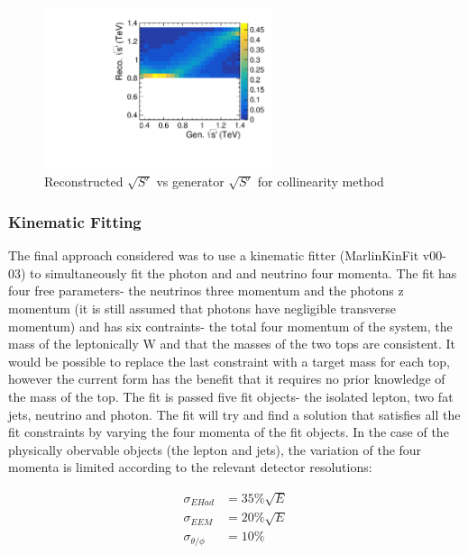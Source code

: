 \begin{figure}
  \centering
  \includegraphics[width=0.6\textwidth]{TopAnalysis/figures/ColEVsTrueE.pdf}
  \caption[Reconstructed $\sqrt{S'}$ vs generator $\sqrt{S'}$ for collinearity method]{Reconstructed $\sqrt{S'}$ vs generator $\sqrt{S'}$ for collinearity method}
  \label{fig:CollinearitySPrime}
\end{figure}

\subsubsection{Kinematic Fitting}

The final approach considered was to use a kinematic fitter (MarlinKinFit v00-03\cite{List:88030}) to simultaneously fit the photon and and neutrino four momenta. The fit has four free parameters- the neutrinos three momentum and the photons z momentum (it is still assumed that photons have negligible transverse momentum) and has six contraints- the total four momentum of the system, the mass of the leptonically W and that the masses of the two tops are consistent. It would be possible to replace the last constraint with a target mass for each top, however the current form has the benefit that it requires no prior knowledge of the mass of the top. The fit is passed five fit objects- the isolated lepton, two fat jets, neutrino and photon.  The fit will try and find a solution that satisfies all the fit constraints by varying the four momenta of the fit objects. In the case of the physically obervable objects (the lepton and jets), the variation of the four momenta is limited according to the relevant detector resolutions:

\begin{align}
  \sigma_{E Had}&=35\%\sqrt{E}
  \\
  \sigma_{E EM}&=20\%\sqrt{E}
\\
  \sigma_{\theta/\phi}&=10\%
\end{align}

